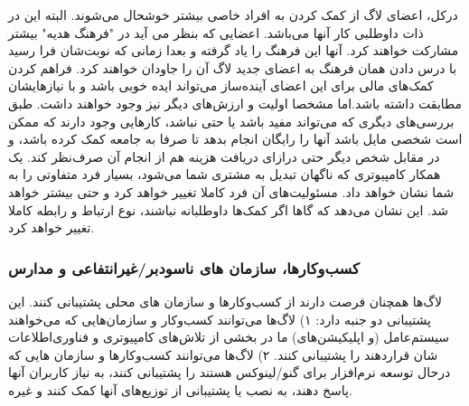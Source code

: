 درکل، اعضای لاگ از کمک کردن به افراد خاصی بیشتر خوشحال می‌شوند.
البته این در ذات داوطلبی کار آنها می‌باشد. اعضایی که بنظر می آید
در "فرهنگ هدیه" بیشتر مشارکت خواهند کرد. آنها این فرهنگ
را یاد گرفته و بعدا زمانی که نوبت‌شان فرا رسید با درس دادن همان فرهنگ
به اعضای جدید لاگ آن را جاودان خواهند کرد.
فراهم کردن کمک‌های مالی برای این اعضای آینده‌ساز می‌تواند ایده خوبی باشد
و با نیازهایشان مطابقت داشته باشد.اما مشخصا اولیت‌
و ارزش‌های دیگر نیز وجود خواهند داشت.
طبق بررسی‌های دیگری که می‌تواند مفید باشد یا حتی نباشد،
کارهایی وجود دارند که ممکن است شخصی مایل باشد آنها را
رایگان انجام بدهد تا صرفا به جامعه کمک کرده باشد،
و در مقابل شخص دیگر حتی درازای دریافت هزینه هم
از انجام آن صرف‌نظر کند.
یک همکار کامپیوتری که ناگهان تبدیل به مشتری شما می‌شود،
بسیار فرد متفاوتی را به شما نشان خواهد داد. مسئولیت‌های
آن فرد کاملا تغییر خواهد کرد و حتی بیشتر خواهد شد.
این نشان می‌دهد که گاها اگر کمک‌ها داوطلبانه نباشند،
نوع ارتباط و رابطه کاملا تغییر خواهد کرد.

\subsubsection{کسب‌وکارها، سازمان های ناسودبر/غیرانتفاعی و مدارس}

لاگ‌ها همچنان فرصت دارند از کسب‌و‌کارها و سازمان‌ های محلی
پشتیبانی کنند. این پشتیبانی دو جنبه دارد:
۱) لاگ‌ها می‌توانند کسب‌وکار و سازمان‌هایی که می‌خواهند
سیستم‌عامل (و اپلیکیشن‌های) ما در بخشی از تلاش‌های
کامپیوتری و فناوری‌اطلاعات شان قراردهند را پشتیبانی کنند.
۲) لاگ‌ها می‌توانند کسب‌وکارها و سازمان هایی که درحال
توسعه نرم‌افزار برای گنو/لینوکس هستند را پشتیبانی کنند،
به نیاز کاربران آنها پاسخ دهند، به نصب یا پشتیبانی از
توزیع‌های آنها کمک کنند و غیره.

